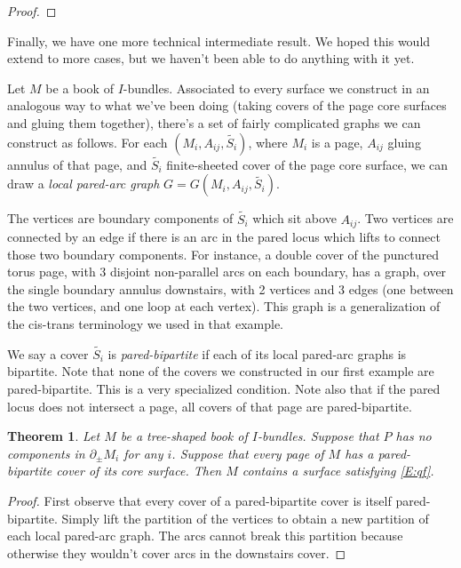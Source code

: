 \documentclass[12pt]{amsart}
\newtheorem{thm}[theorem]{Theorem}
\theoremstyle{definition}
\theoremstyle{remark}
\newcommand{\bd}{\partial}
\begin{document}
{\begin{proof}
\end{proof}

Finally, we have one more technical intermediate result. We hoped this would
extend to more cases, but we haven't been able to do anything with it yet.

Let $M$ be a book of $I$-bundles. Associated to every surface we construct in
an analogous way to what we've been doing (taking covers of the page core
surfaces and gluing them together), there's a set of fairly complicated graphs
we can construct as follows. For each $(M_i,A_{ij},\widetilde{S_i})$, where
$M_i$ is a page, $A_{ij}$ gluing annulus of that page, and $\widetilde{S_i}$
finite-sheeted cover of the page core surface, we can draw a \emph{local
pared-arc graph} $G=G(M_i,A_{ij},\widetilde{S_i})$.

The vertices are boundary components of $\widetilde{S_i}$ which sit above
$A_{ij}$. Two vertices are connected by an edge if there is an arc in the pared
locus which lifts to connect those two boundary components. For instance,
a double cover of the punctured torus page, with 3 disjoint non-parallel arcs
on each boundary, has a graph, over the single boundary annulus downstairs,
with 2 vertices and 3 edges (one between the two vertices, and one loop at each
vertex). This graph is a generalization of the cis-trans terminology we used in
that example.

We say a cover $\widetilde{S_i}$ is \emph{pared-bipartite} if each of its local
pared-arc graphs is bipartite. Note that none of the covers we constructed in
our first example are pared-bipartite. This is a very specialized condition.
Note also that if the pared locus does not intersect a page, all covers of that
page are pared-bipartite.

\begin{thm}

Let $M$ be a tree-shaped book of $I$-bundles. Suppose that $P$ has no
components in $\bd_\pm M_i$ for any $i$. Suppose that every page of $M$
has a pared-bipartite cover of its core surface. Then $M$ contains a surface
satisfying \eqref{E:qf}.

\end{thm}
\begin{proof}

First observe that every cover of a pared-bipartite cover is itself
pared-bipartite. Simply lift the partition of the vertices to obtain a new
partition of each local pared-arc graph. The arcs cannot break this
partition because otherwise they wouldn't cover arcs in the downstairs cover.


\end{proof}}
\end{document}
